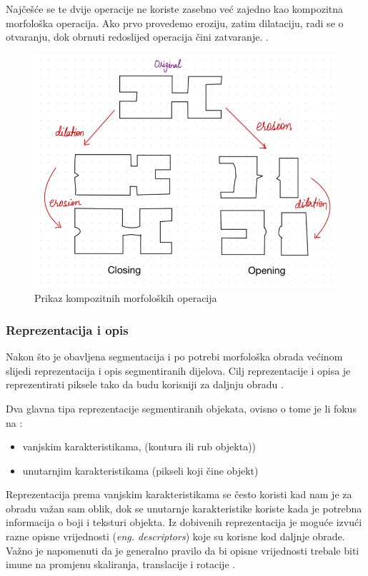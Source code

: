 \documentclass{foi}
\begin{document}
Najčešće se te dvije operacije ne koriste zasebno već zajedno kao kompozitna morfološka operacija. Ako prvo provedemo eroziju, zatim dilataciju, radi se o otvaranju, dok obrnuti redoslijed operacija čini zatvaranje. \cite{morph}.

\begin{figure}[H]
    \centering
    \includegraphics[width=0.6\linewidth]{slike/otvaranje_zatvaranje.png}
    \caption{Prikaz kompozitnih morfoloških operacija \cite{morph}}
\end{figure}

\subsubsection{Reprezentacija i opis}
Nakon što je obavljena segmentacija i po potrebi morfološka obrada većinom slijedi reprezentacija i opis segmentiranih dijelova. Cilj reprezentacije i opisa je reprezentirati piksele tako da budu korisniji za daljnju obradu \cite{RepAndDesc}. 

\begin{flushleft}
    Dva glavna tipa reprezentacije segmentiranih objekata, ovisno o tome je li fokus na \cite{RepAndDesc}:

\begin{itemize}
    \item vanjskim karakteristikama, (kontura ili rub objekta))
    \item unutarnjim karakteristikama (pikseli koji čine objekt)
\end{itemize}
\end{flushleft}

Reprezentacija prema vanjskim karakteristikama se često koristi kad nam je za obradu važan sam oblik, dok se unutarnje karakteristike koriste kada je potrebna informacija o boji i teksturi objekta. Iz dobivenih reprezentacija je moguće izvući razne opisne vrijednosti (\textit{eng. descriptors}) koje su korisne kod daljnje obrade. Važno je napomenuti da je generalno pravilo da bi opisne vrijednosti trebale biti imune na promjenu skaliranja, translacije i rotacije \cite{RepAndDesc}.
\end{document}
